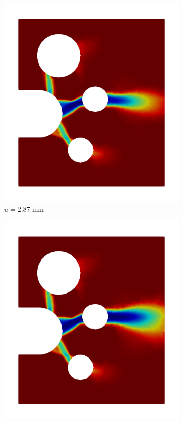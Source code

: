 \begin{figure}[!htb]
  \begin{subfigure}{0.17\textwidth}
    \centering
    \includegraphics[width=\textwidth,scale=0.5]{Chapter5/figures/SFC/M_1}
    \caption{$u = \SI{2.87}{\milli\meter}$}
    \label{fig: Chapter5/SFC/gc_1}
  \end{subfigure}
  \hspace{0.03\textwidth}
  \begin{subfigure}{0.17\textwidth}
    \centering
    \includegraphics[width=\textwidth,scale=0.5]{Chapter5/figures/SFC/M_2}

\end{subfigure}
\end{figure}
